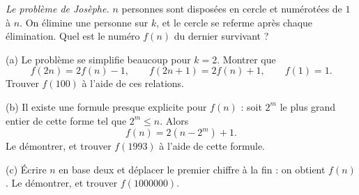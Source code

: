 \emph{Le problème de Josèphe.} $n$ personnes sont disposées en cercle et numérotées de $1$ à $n$. On élimine une personne sur $k$, et le cercle se referme après chaque élimination. Quel est le numéro $f(n)$ du dernier survivant ?

(a) Le problème se simplifie beaucoup pour $k = 2$. Montrer que
\[ f(2n) = 2f(n) - 1,\qquad f(2n+1) = 2f(n) + 1,\qquad f(1) = 1. \]
Trouver $f(100)$ à l'aide de ces relations.

(b) Il existe une formule presque explicite pour $f(n)$ : soit $2^m$ le plus grand entier de cette forme tel que $2^m \leq n$. Alors
\[ f(n) = 2(n - 2^m) + 1. \]
Le démontrer, et trouver $f(1993)$ à l'aide de cette formule.

(c) Écrire $n$ en base deux et déplacer le premier chiffre à la fin : on obtient $f(n)$. Le démontrer, et trouver $f(1000000)$.
